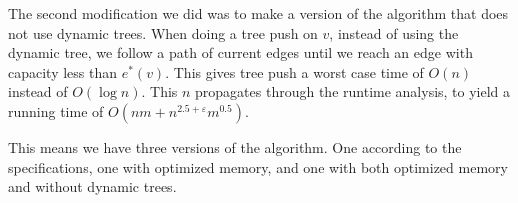 The second modification we did was to make a version of the algorithm that does not use dynamic trees. 
When doing a tree push on $v$, instead of using the dynamic tree, we follow a path of current edges until we reach an edge with capacity less than $e^*(v)$.
This gives tree push a worst case time of $O(n)$ instead of $O(\log n)$. This $n$ propagates through the runtime analysis, to yield a running time of $O(nm + n^{2.5+\varepsilon}m^{0.5})$.

This means we have three versions of the algorithm. One according to the specifications, one with optimized memory, and one with both optimized memory and without dynamic trees.
